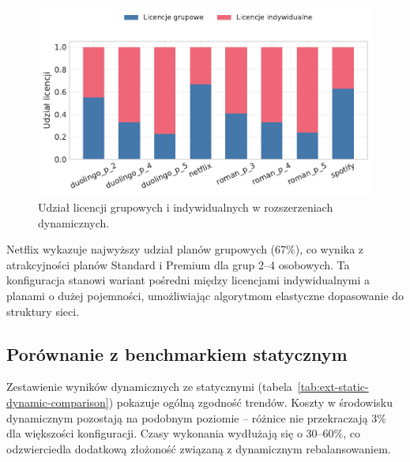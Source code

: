 \begin{figure}[H]
    \centering
    \includegraphics[width=0.8\linewidth]{assets/figures/extensions/dynamic/license_mix.pdf}
    \caption{Udział licencji grupowych i indywidualnych w rozszerzeniach dynamicznych.}
    \label{fig:ext-dynamic-license-mix}
\end{figure}

Netflix wykazuje najwyższy udział planów grupowych (67\%), co wynika z atrakcyjności planów Standard i Premium dla grup 2--4 osobowych. Ta konfiguracja stanowi wariant pośredni między licencjami indywidualnymi a planami o dużej pojemności, umożliwiając algorytmom elastyczne dopasowanie do struktury sieci.

\subsection{Porównanie z benchmarkiem statycznym}

Zestawienie wyników dynamicznych ze statycznymi (tabela~\ref{tab:ext-static-dynamic-comparison}) pokazuje ogólną zgodność trendów. Koszty w środowisku dynamicznym pozostają na podobnym poziomie -- różnice nie przekraczają 3\% dla większości konfiguracji. Czasy wykonania wydłużają się o 30--60\%, co odzwierciedla dodatkową złożoność związaną z dynamicznym rebalansowaniem.

